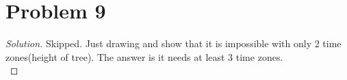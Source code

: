 \section*{Problem 9}
	\begin{proof} [Solution]
		Skipped. Just drawing and show that it is impossible with only 2 time zones(height of tree). The answer is it needs at least 3 time zones.\\
	\end{proof}